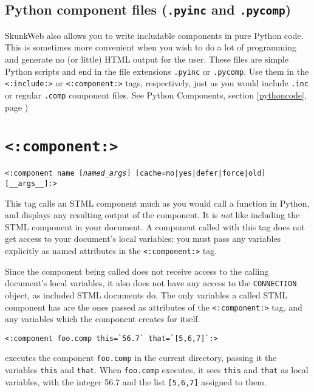 \documentclass{manual}
\begin{document}
\subsection{Python component files (\texttt{.pyinc} and \texttt{.pycomp})}

SkunkWeb also allows you to write includable components in pure Python
code. This is sometimes more convenient when you wish to do a lot of
programming and generate no (or little) HTML output for the
user. These files are simple Python scripts and end in the file
extensions \texttt{.pyinc}  or  \texttt{.pycomp}.  Use them in the 
\texttt{<:include:>} or \texttt{<:component:>} 
tags, respectively,  just as you would include \texttt{.inc} or regular
\texttt{.comp} component files.  See Python Components,
section \ref{pythoncode}, page \pageref{pythoncode})




\section{\texttt{<:component:>}}
\label{tagcomponent}

\texttt{<:component name [\emph{named_args}] [cache=no|yes|defer|force|old] [__args__]:>}

This tag calls an STML component much as you would call a function
in Python, and displays any resulting output of the component. It is
\emph{not} like including the STML component in your document. A
component called with this tag does not get access to your document's
local variables; you must pass any variables explicitly as named
attributes in the \texttt{<:component:>} tag.

Since the component being called does not receive access to the
calling document's local variables, it also does not have any access
to the \texttt{CONNECTION} object, as included STML documents do. The
only variables a called STML component has are the ones passed as
attributes of the \texttt{<:component:>} tag, and any variables which
the component creates for itself.

\begin{verbatim}<:component foo.comp this=`56.7` that=`[5,6,7]`:>
\end{verbatim}

executes the component \texttt{foo.comp} in the current directory,
passing it the variables \texttt{this} and \texttt{that}.  When
\texttt{foo.comp} executes, it sees \texttt{this} and \texttt{that} as
local variables, with the integer 56.7 and the list \texttt{[5,6,7]}
assigned to them.
\end{document}
